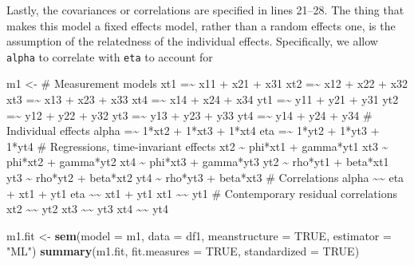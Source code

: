 \documentclass[]{interact}
\theoremstyle{plain}%
\theoremstyle{definition}
\theoremstyle{remark}
\newenvironment{Shaded}{\begin{snugshade}}{\end{snugshade}}
\newcommand{\DataTypeTok}[1]{\textcolor[rgb]{0.13,0.29,0.53}{#1}}
\newcommand{\KeywordTok}[1]{\textcolor[rgb]{0.13,0.29,0.53}{\textbf{#1}}}
\newcommand{\NormalTok}[1]{#1}
\newcommand{\OtherTok}[1]{\textcolor[rgb]{0.56,0.35,0.01}{#1}}
\newcommand{\StringTok}[1]{\textcolor[rgb]{0.31,0.60,0.02}{#1}}
\begin{document}
Lastly, the covariances or correlations are specified in lines 21--28.
The thing that makes this model a fixed effects model, rather than a
random effects one, is the assumption of the relatedness of the
individual effects. Specifically, we allow \texttt{alpha} to correlate
with \texttt{eta} to account for

\begin{Shaded}
\begin{Highlighting}[numbers=left,,]
\NormalTok{m1 \textless{}{-}}\StringTok{ \textquotesingle{}}
\StringTok{\# Measurement models }
\StringTok{xt1 =\textasciitilde{} x11 + x21 + x31}
\StringTok{xt2 =\textasciitilde{} x12 + x22 + x32}
\StringTok{xt3 =\textasciitilde{} x13 + x23 + x33}
\StringTok{xt4 =\textasciitilde{} x14 + x24 + x34}
\StringTok{yt1 =\textasciitilde{} y11 + y21 + y31}
\StringTok{yt2 =\textasciitilde{} y12 + y22 + y32}
\StringTok{yt3 =\textasciitilde{} y13 + y23 + y33}
\StringTok{yt4 =\textasciitilde{} y14 + y24 + y34}
\StringTok{\# Individual effects}
\StringTok{alpha =\textasciitilde{} 1*xt2 + 1*xt3 + 1*xt4 }
\StringTok{eta   =\textasciitilde{} 1*yt2 + 1*yt3 + 1*yt4}
\StringTok{\# Regressions, time{-}invariant effects}
\StringTok{xt2 \textasciitilde{} phi*xt1 + gamma*yt1 }
\StringTok{xt3 \textasciitilde{} phi*xt2 + gamma*yt2}
\StringTok{xt4 \textasciitilde{} phi*xt3 + gamma*yt3}
\StringTok{yt2 \textasciitilde{} rho*yt1 + beta*xt1 }
\StringTok{yt3 \textasciitilde{} rho*yt2 + beta*xt2}
\StringTok{yt4 \textasciitilde{} rho*yt3 + beta*xt3}
\StringTok{\# Correlations}
\StringTok{alpha \textasciitilde{}\textasciitilde{} eta + xt1 + yt1}
\StringTok{eta   \textasciitilde{}\textasciitilde{} xt1 + yt1 }
\StringTok{xt1   \textasciitilde{}\textasciitilde{} yt1}
\StringTok{\# Contemporary residual correlations}
\StringTok{xt2 \textasciitilde{}\textasciitilde{} yt2}
\StringTok{xt3 \textasciitilde{}\textasciitilde{} yt3}
\StringTok{xt4 \textasciitilde{}\textasciitilde{} yt4}
\StringTok{\textquotesingle{}}
\end{Highlighting}
\end{Shaded}

\begin{Shaded}
\begin{Highlighting}[]
\NormalTok{m1.fit \textless{}{-}}\StringTok{ }\KeywordTok{sem}\NormalTok{(}\DataTypeTok{model =}\NormalTok{ m1, }\DataTypeTok{data =}\NormalTok{ df1, }\DataTypeTok{meanstructure =} \OtherTok{TRUE}\NormalTok{, }\DataTypeTok{estimator =} \StringTok{"ML"}\NormalTok{)}
\KeywordTok{summary}\NormalTok{(m1.fit, }\DataTypeTok{fit.measures =} \OtherTok{TRUE}\NormalTok{, }\DataTypeTok{standardized =} \OtherTok{TRUE}\NormalTok{)}
\end{Highlighting}
\end{Shaded}
\end{document}
